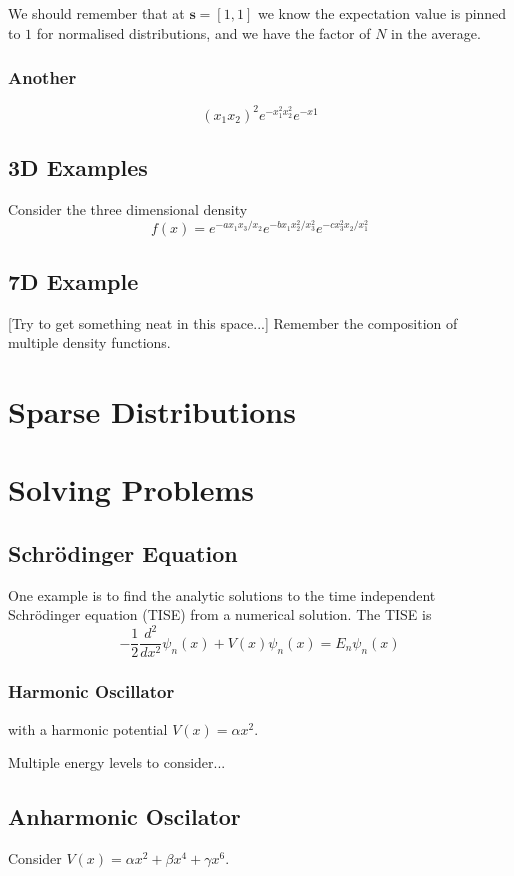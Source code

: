 \documentclass{article}
\begin{document}
We should remember that at $\mathbf{s} =[1,1]$ we know the expectation value is pinned to $1$ for normalised distributions, and we have the factor of $N$ in the average.




\subsubsection{Another}
$$
(x_1 x_2)^2 e^{-x_1^2x_2^2}e^{-x1}
$$


\subsection{3D Examples}
Consider the three dimensional density
$$
f(x) = e^{-a x_1 x_3/x_2}e^{-b x_1 x_2^2/x_3^2}e^{- c x_3^2 x_2/x_1^2}
$$

\subsection{7D Example}
[Try to get something neat in this space...]
Remember the composition of multiple density functions.


\section{Sparse Distributions}

\section{Solving Problems}

\subsection{Schr\"odinger Equation}
One example is to find the analytic solutions to the time independent Schr\"odinger equation (TISE) from a numerical solution. The TISE is
$$
- \frac{1}{2}\frac{d^2}{dx^2} \psi_n(x) + V(x)\psi_n(x) = E_n \psi_n(x)
$$



\subsubsection{Harmonic Oscillator}


with a harmonic potential 
$V(x) = \alpha x^2$.



Multiple energy levels to consider...

\subsection{Anharmonic Oscilator}
Consider $V(x) = \alpha x^2 + \beta x^4 + \gamma x^6$.
\end{document}
